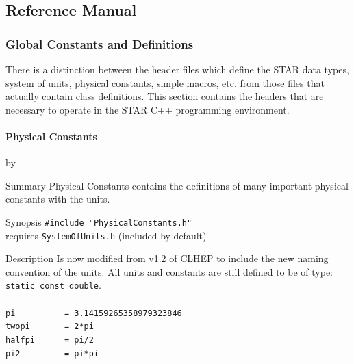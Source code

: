 \documentclass[twoside]{article}
\newcommand{\comp}[1]{\texttt{#1}}%
\newcommand{\entrylabel}[1]{\mbox{\textbf{{#1}}}\hfil}%
\newenvironment{entry}
{\begin{list}{}%
    {\renewcommand{\makelabel}{\entrylabel}%
     \setlength{\labelwidth}{90pt}%
     \setlength{\leftmargin}{\labelwidth}
     \advance\leftmargin by \labelsep%
      }%
    }%
  {\end{list}}
\newcommand{\Entrylabel}[1]%
{\raisebox{0pt}[1ex][0pt]{\makebox[\labelwidth][l]%
    {\parbox[t]{\labelwidth}{\hspace{0pt}\textbf{{#1}}}}}}
\newenvironment{Entry}%
{\renewcommand{\entrylabel}{\Entrylabel}\begin{entry}}%
  {\end{entry}}
\begin{document}
\begin{description}
%
%
\part{Reference Manual}
\clearpage

\section{Global Constants and Definitions}
There is a distinction between the header files which define
the STAR data types, system of units, physical constants,
simple macros, etc. from those files that actually contain
class definitions.  This section contains the headers that
are necessary to operate in the STAR C++ programming environment.


\subsection{Physical Constants} 
\begin{Entry}
\item[Summary]
  Physical Constants contains the definitions of many
  important physical constants with the units.
        

\item[Synopsis]
  \verb+#include "PhysicalConstants.h"+ \\  
  requires \comp{SystemOfUnits.h} (included by default)
  
  
\item[Description]
  Is now modified from v1.2 of CLHEP  to include the
  new naming convention of the units.  All units
  and constants are still defined to be of type:\\ \comp{static const double}. \\ \\
  \verb+pi          = 3.14159265358979323846+ \\   
  \verb+twopi       = 2*pi+  \\                    
  \verb+halfpi      = pi/2+ \\                     
  \verb+pi2         = pi*pi+ \\                    
  

\end{Entry}
\end{description}
\end{document}
